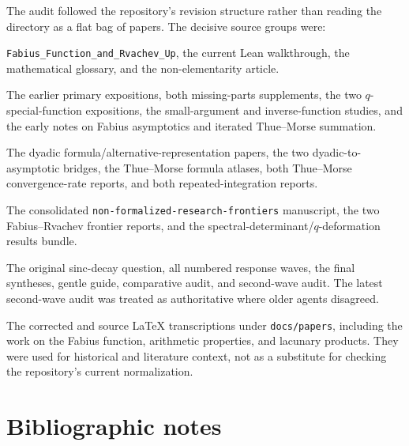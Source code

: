 \documentclass[11pt,oneside]{article}
\theoremstyle{definition}
\theoremstyle{remark}
\begin{document}
The audit followed the repository's revision structure rather than reading the
directory as a flat bag of papers.  The decisive source groups were:
\begin{description}[style=nextline,leftmargin=2.2em,labelindent=0pt]
\item[Current expository core.]
\texttt{Fabius\_Function\_and\_Rvachev\_Up}, the current Lean walkthrough,
the mathematical glossary, and the non-elementarity article.

\item[Archived foundational studies.]
The earlier primary expositions, both missing-parts supplements, the two
$q$-special-function expositions, the small-argument and inverse-function
studies, and the early notes on Fabius asymptotics and iterated Thue--Morse
summation.

\item[Exact arithmetic and convergence studies.]
The dyadic formula/alternative-representation papers, the two
dyadic-to-asymptotic bridges, the Thue--Morse formula atlases, both
Thue--Morse convergence-rate reports, and both repeated-integration reports.

\item[Live frontier synthesis.]
The consolidated \texttt{non-formalized-research-frontiers} manuscript, the two
Fabius--Rvachev frontier reports, and the spectral-determinant/$q$-deformation
results bundle.

\item[Fourier-decay campaign.]
The original sinc-decay question, all numbered response waves, the final
syntheses, gentle guide, comparative audit, and second-wave audit.  The latest
second-wave audit was treated as authoritative where older agents disagreed.

\item[Reference transcriptions.]
The corrected and source \LaTeX{} transcriptions under \texttt{docs/papers},
including the work on the Fabius function, arithmetic properties, and lacunary
products.  They were used for historical and literature context, not as a
substitute for checking the repository's current normalization.
\end{description}

\section{Bibliographic notes}
\end{document}
